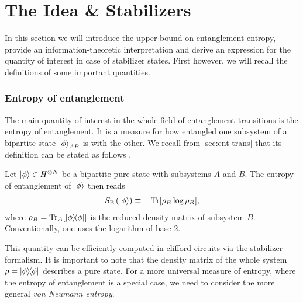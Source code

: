 \section{The Idea \& Stabilizers}\label{sec:upperbound-idea}
In this section we will introduce the upper bound on entanglement entropy,
provide an information-theoretic interpretation and derive an expression for
the quantity of interest in case of stabilizer states. First however, we will
recall the definitions of some important quantities.
\subsubsection{Entropy of entanglement}
The main quantity of interest in the whole field of entanglement transitions is
the entropy of entanglement. It is a measure for how entangled one subsystem of a
bipartite state $\ket{\phi}_{AB}$ is with the other. We recall from
\cref{sec:ent-trans} that its definition can be stated as follows
\cite{fattalEntanglementStabilizerFormalism2004}.
\begin{defn}\label{defn:entanglement-entropy}
  Let $\ket{\phi}\in H^{\otimes N}$ be a bipartite pure state with subsystems
  $A$ and $B$. The entropy of entanglement of $\ket{\phi}$ then reads
  \begin{align}
    S_\mathrm{E}\left(\ket{\phi}\right) \equiv - \Tr[\rho_B \log \rho_B],
  \end{align}
  where $\rho_B = \Tr_A[\dyad{\phi}]$ is the reduced density matrix of subsystem
  $B$. Conventionally, one uses the logarithm of base 2.
\end{defn}
This quantity can be efficiently computed in clifford circuits via the
stabilizer formalism. It is important to note that the density matrix of the
whole system $\rho = \dyad{\phi}$ describes a pure state. For a more universal
measure of entropy, where the entropy of entanglement is a special case, we
need to consider the more general \emph{von Neumann entropy}.
